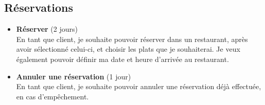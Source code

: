 \documentclass[10pt,a4paper]{article}
\begin{document}
\subsection{Réservations}
\begin{itemize}
\item \textbf{Réserver} (2 jours)\\
En tant que client, je souhaite pouvoir réserver dans un restaurant, après avoir sélectionné celui-ci, et choisir les plats que je souhaiterai. Je veux également pouvoir définir ma date et heure d'arrivée au restaurant.
\item \textbf{Annuler une réservation} (1 jour)\\
En tant que client, je souhaite pouvoir annuler une réservation déjà effectuée, en cas d'empêchement.
\end{itemize}
\end{document}
